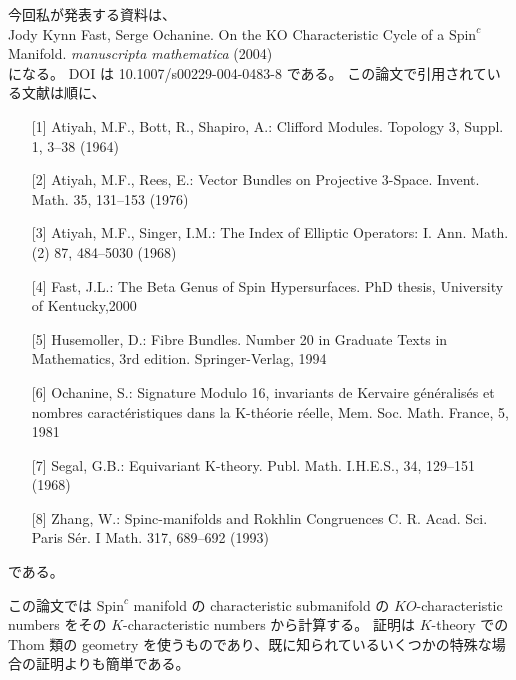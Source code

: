 今回私が発表する資料は、\\
Jody Kynn Fast, Serge Ochanine. On the KO Characteristic Cycle of a \(\text{Spin}^c\) Manifold. \textit{manuscripta mathematica} (2004)\\
になる。
DOI は 10.1007/s00229-004-0483-8 である。
この論文で引用されている文献は順に、
\begin{itemize}
  \item[{[1]}] Atiyah, M.F., Bott, R., Shapiro, A.: Clifford Modules. Topology 3, Suppl. 1, 3–38 (1964)
  \item[{[2]}] Atiyah, M.F., Rees, E.: Vector Bundles on Projective 3-Space. Invent. Math. 35, 131–153 (1976)
  \item[{[3]}] Atiyah, M.F., Singer, I.M.: The Index of Elliptic Operators: I. Ann. Math. (2) 87, 484–5030 (1968)
  \item[{[4]}] Fast, J.L.: The Beta Genus of Spin Hypersurfaces. PhD thesis, University of Kentucky,2000
  \item[{[5]}] Husemoller, D.: Fibre Bundles. Number 20 in Graduate Texts in Mathematics, 3rd edition. Springer-Verlag, 1994
  \item[{[6]}] Ochanine, S.: Signature Modulo 16, invariants de Kervaire g\'en\'eralis\'es et nombres caract\'eristiques dans la K-th\'eorie r\'eelle, Mem. Soc. Math. France, 5, 1981
  \item[{[7]}] Segal, G.B.: Equivariant K-theory. Publ. Math. I.H.E.S., 34, 129–151 (1968)
  \item[{[8]}] Zhang, W.: Spinc-manifolds and Rokhlin Congruences C. R. Acad. Sci. Paris S\'er. I
  Math. 317, 689–692 (1993)
\end{itemize}
である。

この論文では \(\text{Spin}^c\) manifold の characteristic submanifold の \(KO\)-characteristic numbers をその \(K\)-characteristic numbers から計算する。
証明は \(K\)-theory での Thom 類の geometry を使うものであり、既に知られているいくつかの特殊な場合の証明よりも簡単である。